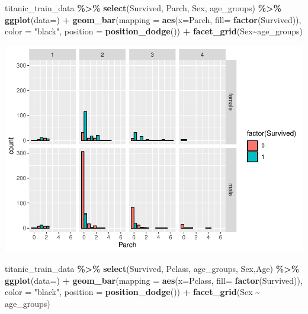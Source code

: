 \documentclass[
]{article}
\newenvironment{Shaded}{\begin{snugshade}}{\end{snugshade}}
\newcommand{\AttributeTok}[1]{\textcolor[rgb]{0.13,0.29,0.53}{#1}}
\newcommand{\FunctionTok}[1]{\textcolor[rgb]{0.13,0.29,0.53}{\textbf{#1}}}
\newcommand{\NormalTok}[1]{#1}
\newcommand{\SpecialCharTok}[1]{\textcolor[rgb]{0.81,0.36,0.00}{\textbf{#1}}}
\newcommand{\StringTok}[1]{\textcolor[rgb]{0.31,0.60,0.02}{#1}}
\begin{document}
\begin{Shaded}
\begin{Highlighting}[]
\NormalTok{titanic\_train\_data }\SpecialCharTok{\%\textgreater{}\%}
  \FunctionTok{select}\NormalTok{(Survived, Parch, Sex, age\_groups) }\SpecialCharTok{\%\textgreater{}\%}
  \FunctionTok{ggplot}\NormalTok{(}\AttributeTok{data=}\NormalTok{) }\SpecialCharTok{+} 
  \FunctionTok{geom\_bar}\NormalTok{(}\AttributeTok{mapping =}  \FunctionTok{aes}\NormalTok{(}\AttributeTok{x=}\NormalTok{Parch, }\AttributeTok{fill=} \FunctionTok{factor}\NormalTok{(Survived)), }\AttributeTok{color =} \StringTok{"black"}\NormalTok{, }\AttributeTok{position =} \FunctionTok{position\_dodge}\NormalTok{()) }\SpecialCharTok{+}
  \FunctionTok{facet\_grid}\NormalTok{(Sex}\SpecialCharTok{\textasciitilde{}}\NormalTok{age\_groups)}
\end{Highlighting}
\end{Shaded}

\includegraphics{Titanic-Documentation_files/figure-latex/unnamed-chunk-34-1.pdf}

\begin{Shaded}
\begin{Highlighting}[]
\NormalTok{titanic\_train\_data }\SpecialCharTok{\%\textgreater{}\%}
  \FunctionTok{select}\NormalTok{(Survived, Pclass, age\_groups, Sex,Age) }\SpecialCharTok{\%\textgreater{}\%}
  \FunctionTok{ggplot}\NormalTok{(}\AttributeTok{data=}\NormalTok{) }\SpecialCharTok{+} 
  \FunctionTok{geom\_bar}\NormalTok{(}\AttributeTok{mapping =}  \FunctionTok{aes}\NormalTok{(}\AttributeTok{x=}\NormalTok{Pclass, }\AttributeTok{fill=} \FunctionTok{factor}\NormalTok{(Survived)), }\AttributeTok{color =} \StringTok{"black"}\NormalTok{, }\AttributeTok{position =} \FunctionTok{position\_dodge}\NormalTok{()) }\SpecialCharTok{+}
  \FunctionTok{facet\_grid}\NormalTok{(Sex }\SpecialCharTok{\textasciitilde{}}\NormalTok{ age\_groups)}
\end{Highlighting}
\end{Shaded}
\end{document}
